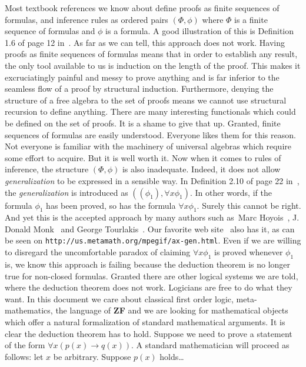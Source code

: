 Most textbook references we know about define proofs as finite
sequences of formulas, and inference rules as ordered pairs
$(\Phi,\phi)$ where $\Phi$ is a finite sequence of formulas and
$\phi$ is a formula. A good illustration of this is Definition 1.6
of page 12 in~\cite{Ferenczi}. As far as we can tell, this approach
does not work. Having proofs as finite sequences of formulas means
that in order to establish any result, the only tool available to us
is induction on the length of the proof. This makes it
excruciatingly painful and messy to prove anything and is far
inferior to the seamless flow of a proof by structural induction.
Furthermore, denying the structure of a free algebra to the set of
proofs means we cannot use structural recursion to define anything.
There are many interesting functionals which could be defined on the
set of proofs. It is a shame to give that up. Granted, finite
sequences of formulas are easily understood. Everyone likes them for
this reason. Not everyone is familiar with the machinery of
universal algebras which require some effort to acquire. But it is
well worth it. Now when it comes to rules of inference, the
structure $(\Phi,\phi)$ is also inadequate. Indeed, it does not
allow {\em generalization} to be expressed in a sensible way. In
Definition 2.10 of page 22 in~\cite{Ferenczi}, the {\em
generalization} is introduced as $((\phi_{1}),\forall x\phi_{1})$.
In other words, if the formula $\phi_{1}$ has been proved, so has
the formula $\forall x\phi_{1}$. Surely this cannot be right. And
yet this is the accepted approach by many authors such as~Marc
Hoyois~\cite{Hoyois}, J. Donald Monk~\cite{Monk} and George
Tourlakis~\cite{Tourlakis}. Our favorite web site~\cite{Metamath}
also has it, as can be seen on
\texttt{http://us.metamath.org/mpegif/ax-gen.html}. Even if we are
willing to disregard the uncomfortable paradox of claiming $\forall
x\phi_{1}$ is proved whenever $\phi_{1}$ is, we know this approach
is failing because the deduction theorem is no longer true for
non-closed formulas. Granted there are other logical systems we are
told, where the deduction theorem does not work. Logicians are free
to do what they want. In this document we care about classical first
order logic, meta-mathematics, the language of {\bf ZF} and we are
looking for mathematical objects which offer a natural formalization
of standard mathematical arguments. It is clear the deduction
theorem has to hold. Suppose we need to prove a statement of the
form $\forall x(p(x)\to q(x))$. A standard mathematician will
proceed as follows: let $x$ be arbitrary. Suppose $p(x)$ holds\ldots
